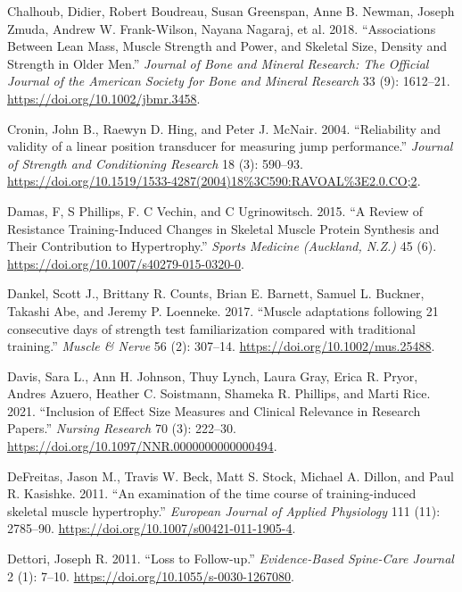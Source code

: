 \documentclass[
  letterpaper,
  DIV=11,
  numbers=noendperiod]{scrreprt}
\newlength{\cslhangindent}
\newlength{\cslentryspacingunit} %
\newenvironment{CSLReferences}[2] %
 {%
  \setlength{\parindent}{0pt}
  \ifodd #1
  \let\oldpar\par
  \def\par{\hangindent=\cslhangindent\oldpar}
  \fi
  \setlength{\parskip}{#2\cslentryspacingunit}
 }%
 {}
\begin{document}
\begin{CSLReferences}{1}{0}
\leavevmode{}%
Chalhoub, Didier, Robert Boudreau, Susan Greenspan, Anne B. Newman,
Joseph Zmuda, Andrew W. Frank-Wilson, Nayana Nagaraj, et al. 2018.
{``Associations Between Lean Mass, Muscle Strength and Power, and
Skeletal Size, Density and Strength in Older Men.''} \emph{Journal of
Bone and Mineral Research: The Official Journal of the American Society
for Bone and Mineral Research} 33 (9): 1612--21.
\url{https://doi.org/10.1002/jbmr.3458}.

\leavevmode{}%
Cronin, John B., Raewyn D. Hing, and Peter J. McNair. 2004.
{``Reliability and validity of a linear position transducer for
measuring jump performance.''} \emph{Journal of Strength and
Conditioning Research} 18 (3): 590--93.
\url{https://doi.org/10.1519/1533-4287(2004)18\%3C590:RAVOAL\%3E2.0.CO;2}.

\leavevmode{}%
Damas, F, S Phillips, F. C Vechin, and C Ugrinowitsch. 2015. {``A Review
of Resistance Training-Induced Changes in Skeletal Muscle Protein
Synthesis and Their Contribution to Hypertrophy.''} \emph{Sports
Medicine (Auckland, N.Z.)} 45 (6).
\url{https://doi.org/10.1007/s40279-015-0320-0}.

\leavevmode{}%
Dankel, Scott J., Brittany R. Counts, Brian E. Barnett, Samuel L.
Buckner, Takashi Abe, and Jeremy P. Loenneke. 2017. {``Muscle
adaptations following 21 consecutive days of strength test
familiarization compared with traditional training.''} \emph{Muscle \&
Nerve} 56 (2): 307--14. \url{https://doi.org/10.1002/mus.25488}.

\leavevmode{}%
Davis, Sara L., Ann H. Johnson, Thuy Lynch, Laura Gray, Erica R. Pryor,
Andres Azuero, Heather C. Soistmann, Shameka R. Phillips, and Marti
Rice. 2021. {``Inclusion of Effect Size Measures and Clinical Relevance
in Research Papers.''} \emph{Nursing Research} 70 (3): 222--30.
\url{https://doi.org/10.1097/NNR.0000000000000494}.

\leavevmode{}%
DeFreitas, Jason M., Travis W. Beck, Matt S. Stock, Michael A. Dillon,
and Paul R. Kasishke. 2011. {``An examination of the time course of
training-induced skeletal muscle hypertrophy.''} \emph{European Journal
of Applied Physiology} 111 (11): 2785--90.
\url{https://doi.org/10.1007/s00421-011-1905-4}.

\leavevmode{}%
Dettori, Joseph R. 2011. {``Loss to Follow-up.''} \emph{Evidence-Based
Spine-Care Journal} 2 (1): 7--10.
\url{https://doi.org/10.1055/s-0030-1267080}.


\end{CSLReferences}
\end{document}

